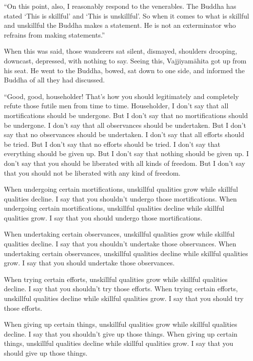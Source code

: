 \documentclass[12pt,openany]{book}%
\begin{document}
“On this point, also, I reasonably respond to the venerables. The Buddha has stated ‘This is skillful’ and ‘This is unskillful’. So when it comes to what is skillful and unskillful the Buddha makes a statement. He is not an exterminator who refrains from making statements.” 

When this was said, those wanderers sat silent, dismayed, shoulders drooping, downcast, depressed, with nothing to say. Seeing this, \textsanskrit{Vajjiyamāhita} got up from his seat. He went to the Buddha, bowed, sat down to one side, and informed the Buddha of all they had discussed. 

“Good, good, householder! That’s how you should legitimately and completely refute those futile men from time to time. Householder, I don’t say that all mortifications should be undergone. But I don’t say that no mortifications should be undergone. I don’t say that all observances should be undertaken. But I don’t say that no observances should be undertaken. I don’t say that all efforts should be tried. But I don’t say that no efforts should be tried. I don’t say that everything should be given up. But I don’t say that nothing should be given up. I don’t say that you should be liberated with all kinds of freedom. But I don’t say that you should not be liberated with any kind of freedom. 

When undergoing certain mortifications, unskillful qualities grow while skillful qualities decline. I say that you shouldn’t undergo those mortifications. When undergoing certain mortifications, unskillful qualities decline while skillful qualities grow. I say that you should undergo those mortifications. 

When undertaking certain observances, unskillful qualities grow while skillful qualities decline. I say that you shouldn’t undertake those observances. When undertaking certain observances, unskillful qualities decline while skillful qualities grow. I say that you should undertake those observances. 

When trying certain efforts, unskillful qualities grow while skillful qualities decline. I say that you shouldn’t try those efforts. When trying certain efforts, unskillful qualities decline while skillful qualities grow. I say that you should try those efforts. 

When giving up certain things, unskillful qualities grow while skillful qualities decline. I say that you shouldn’t give up those things. When giving up certain things, unskillful qualities decline while skillful qualities grow. I say that you should give up those things. 
\end{document}
